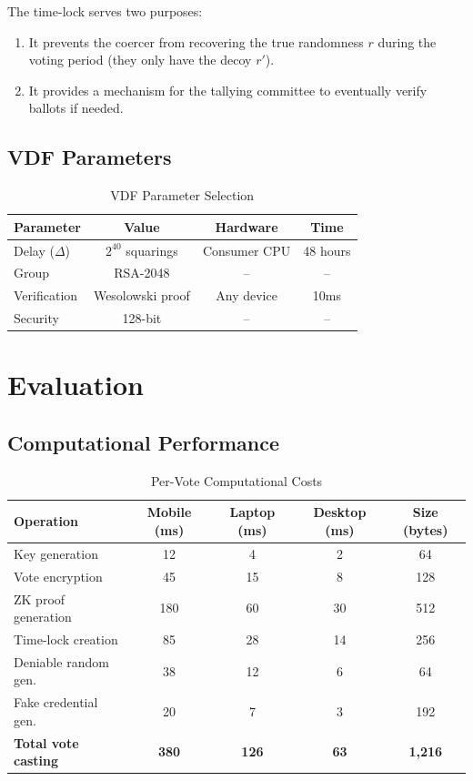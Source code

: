 \documentclass[11pt,a4paper]{article}
\begin{document}
The time-lock serves two purposes:
\begin{enumerate}
    \item It prevents the coercer from recovering the true randomness $r$ during the voting period (they only have the decoy $r'$).
    \item It provides a mechanism for the tallying committee to eventually verify ballots if needed.
\end{enumerate}

\subsection{VDF Parameters}

\begin{table}[H]
\centering
\caption{VDF Parameter Selection}
\label{tab:vdf}
\begin{tabular}{lccc}
\toprule
\textbf{Parameter} & \textbf{Value} & \textbf{Hardware} & \textbf{Time} \\
\midrule
Delay ($\Delta$) & $2^{40}$ squarings & Consumer CPU & 48 hours \\
Group & RSA-2048 & -- & -- \\
Verification & Wesolowski proof & Any device & 10ms \\
Security & 128-bit & -- & -- \\
\bottomrule
\end{tabular}
\end{table}

\section{Evaluation}

\subsection{Computational Performance}

\begin{table}[H]
\centering
\caption{Per-Vote Computational Costs}
\label{tab:perf}
\begin{tabular}{lcccc}
\toprule
\textbf{Operation} & \textbf{Mobile (ms)} & \textbf{Laptop (ms)} & \textbf{Desktop (ms)} & \textbf{Size (bytes)} \\
\midrule
Key generation & 12 & 4 & 2 & 64 \\
Vote encryption & 45 & 15 & 8 & 128 \\
ZK proof generation & 180 & 60 & 30 & 512 \\
Time-lock creation & 85 & 28 & 14 & 256 \\
Deniable random gen. & 38 & 12 & 6 & 64 \\
Fake credential gen. & 20 & 7 & 3 & 192 \\
\midrule
\textbf{Total vote casting} & \textbf{380} & \textbf{126} & \textbf{63} & \textbf{1{,}216} \\
\bottomrule
\end{tabular}
\end{table}
\end{document}
